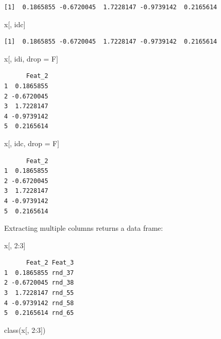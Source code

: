 \documentclass[
]{book}
\newenvironment{Shaded}{\begin{snugshade}}{\end{snugshade}}
\newcommand{\DecValTok}[1]{\textcolor[rgb]{0.00,0.00,0.81}{#1}}
\newcommand{\FunctionTok}[1]{\textcolor[rgb]{0.00,0.00,0.00}{#1}}
\newcommand{\NormalTok}[1]{#1}
\newcommand{\OtherTok}[1]{\textcolor[rgb]{0.56,0.35,0.01}{#1}}
\newcommand{\SpecialCharTok}[1]{\textcolor[rgb]{0.00,0.00,0.00}{#1}}
\begin{document}
\begin{verbatim}
[1]  0.1865855 -0.6720045  1.7228147 -0.9739142  0.2165614
\end{verbatim}

\begin{Shaded}
\begin{Highlighting}[]
\NormalTok{x[, idc]}
\end{Highlighting}
\end{Shaded}

\begin{verbatim}
[1]  0.1865855 -0.6720045  1.7228147 -0.9739142  0.2165614
\end{verbatim}

\begin{Shaded}
\begin{Highlighting}[]
\NormalTok{x[, idi, drop }\OtherTok{=}\NormalTok{ F]}
\end{Highlighting}
\end{Shaded}

\begin{verbatim}
      Feat_2
1  0.1865855
2 -0.6720045
3  1.7228147
4 -0.9739142
5  0.2165614
\end{verbatim}

\begin{Shaded}
\begin{Highlighting}[]
\NormalTok{x[, idc, drop }\OtherTok{=}\NormalTok{ F]}
\end{Highlighting}
\end{Shaded}

\begin{verbatim}
      Feat_2
1  0.1865855
2 -0.6720045
3  1.7228147
4 -0.9739142
5  0.2165614
\end{verbatim}

Extracting multiple columns returns a data frame:

\begin{Shaded}
\begin{Highlighting}[]
\NormalTok{x[, }\DecValTok{2}\SpecialCharTok{:}\DecValTok{3}\NormalTok{]}
\end{Highlighting}
\end{Shaded}

\begin{verbatim}
      Feat_2 Feat_3
1  0.1865855 rnd_37
2 -0.6720045 rnd_38
3  1.7228147 rnd_55
4 -0.9739142 rnd_58
5  0.2165614 rnd_65
\end{verbatim}

\begin{Shaded}
\begin{Highlighting}[]
\FunctionTok{class}\NormalTok{(x[, }\DecValTok{2}\SpecialCharTok{:}\DecValTok{3}\NormalTok{])}
\end{Highlighting}
\end{Shaded}
\end{document}
